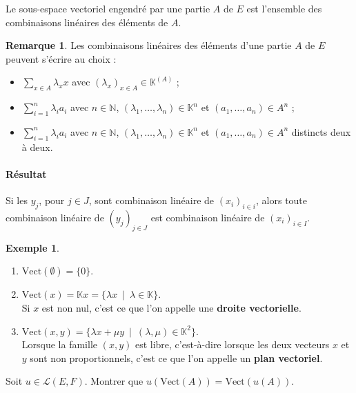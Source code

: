 \documentclass[french]{article}
\newcommand{\N}{\mathbb{N}}
\newcommand{\K}{\mathbb{K}}
\newcommand{\Vect}{\text{Vect}}
\theoremstyle{plain}
\theoremstyle{definition}
\newtheorem*{ex}{Exemple}
\newtheorem*{rmq}{Remarque}
\theoremstyle{remark}
\begin{document}
\begin{prop}
	Le sous-espace vectoriel engendré par une partie $A$ de $E$ est l'ensemble des combinaisons linéaires des éléments de $A$.
\end{prop}

\begin{rmq}
	Les combinaisons linéaires des éléments d'une partie $A$ de $E$ peuvent s'écrire au choix :
	\begin{itemize}
		\item $\displaystyle\sum_{x\in A}\lambda_x x$ avec $(\lambda_x)_{x\in A}\in\K^{(A)}$ ;
		\item $\displaystyle\sum_{i=1}^{n}\lambda_i a_i$ avec $n\in\N$, $(\lambda_1,\ldots,\lambda_n)\in\K^n $ et $(a_1,\ldots,a_n)\in A^n$ ;
		\item $\displaystyle\sum_{i=1}^{n}\lambda_i a_i$ avec $n\in\N$, $(\lambda_1,\ldots,\lambda_n)\in\K^n $ et $(a_1,\ldots,a_n)\in A^n$ distincts deux à deux.
	\end{itemize}
\end{rmq}

\paragraph{Résultat} Si les $y_j$, pour $j\in J$, sont combinaison linéaire de $(x_i)_{i\in i}$, alors toute combinaison linéaire de $(y_j)_{j\in J}$ est combinaison linéaire de $(x_i)_{i\in I}$.

\begin{ex}
	\begin{enumerate}
		\item $\Vect(\emptyset)=\{0\}$.
		\item $\Vect(x)=\K x=\{\lambda x\ \mid\ \lambda\in\K\}$. \\ Si $x$ est non nul, c'est ce que l'on appelle une \textbf{droite vectorielle}.
		\item $\Vect(x,y)=\{\lambda x+\mu y\ \mid\ (\lambda,\mu)\in\K^2\}$. \\ Lorsque la famille $(x,y)$ est libre, c'est-à-dire lorsque les deux vecteurs $x$ et $y$ sont non proportionnels, c'est ce que l'on appelle un \textbf{plan vectoriel}.
	\end{enumerate}
\end{ex}

\begin{exo}
	Soit $u\in\mathcal{L}(E,F)$. Montrer que $u\left(\Vect(A)\right)=\Vect(u(A))$.
\end{exo}
\end{document}
